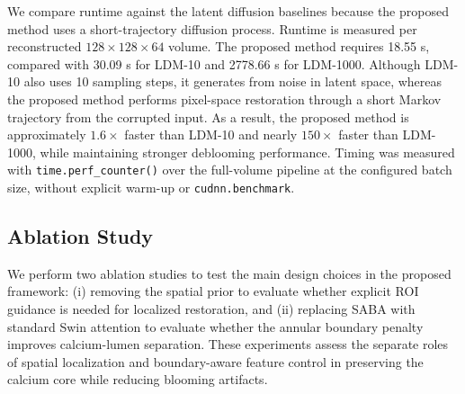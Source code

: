 \documentclass[singleLetter,times]{sagej}
\begin{document}
We compare runtime against the latent diffusion baselines because the proposed method uses a short-trajectory diffusion process. Runtime is measured per reconstructed $128\times128\times64$ volume. The proposed method requires 18.55 s, compared with 30.09 s for LDM-10 and 2778.66 s for LDM-1000. Although LDM-10 also uses 10 sampling steps, it generates from noise in latent space, whereas the proposed method performs pixel-space restoration through a short Markov trajectory from the corrupted input. 
As a result, the proposed method is approximately $1.6\times$ faster than LDM-10 and nearly $150\times$ faster than LDM-1000, while maintaining stronger deblooming performance. 
Timing was measured with \texttt{time.perf\_counter()} over the full-volume pipeline at the configured batch size, without explicit warm-up or \texttt{cudnn.benchmark}.

\subsection{Ablation Study}

We perform two ablation studies to test the main design choices in the proposed framework: (i) removing the spatial prior to evaluate whether explicit ROI guidance is needed for localized restoration, and (ii) replacing SABA with standard Swin attention to evaluate whether the annular boundary penalty improves calcium-lumen separation. These experiments assess the separate roles of spatial localization and boundary-aware feature control in preserving the calcium core while reducing blooming artifacts.
\end{document}
